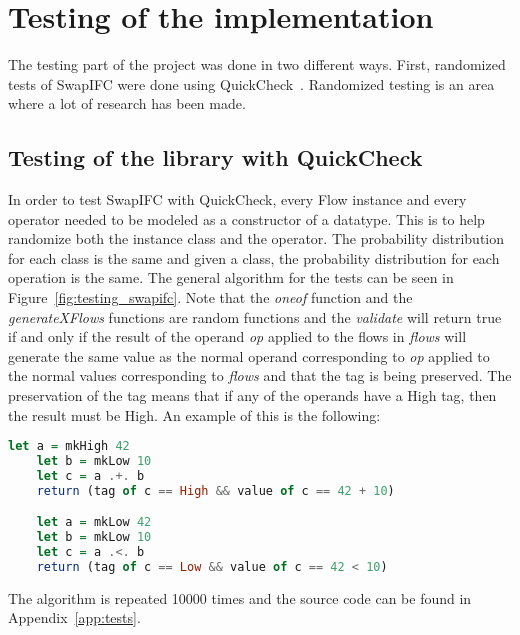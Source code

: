 \chapter{Testing of the implementation}
The testing part of the project was done in two different ways. First, randomized tests of SwapIFC were done using QuickCheck~\cite{quickcheck, quickcheck-wiki}. Randomized testing is an area where a lot of research has been made.
\section{Testing of the library with QuickCheck}
In order to test SwapIFC with QuickCheck, every Flow instance and every operator needed to be modeled as a constructor of a datatype. This is to help randomize both the instance class and the operator. The probability distribution for each class is the same and given a class, the probability distribution for each operation is the same. The general algorithm for the tests can be seen in Figure~\ref{fig:testing_swapifc}. Note that the \emph{oneof} function and the \emph{generateXFlows} functions are random functions and the \emph{validate} will return true if and only if the result of the operand \emph{op} applied to the flows in \emph{flows} will generate the same value as the normal operand corresponding to \emph{op} applied to the normal values corresponding to \emph{flows} and that the tag is being preserved. The preservation of the tag means that if any of the operands have a High tag, then the result must be High. An example of this is the following:
\begin{center}
  \begin{lstlisting}[language=Haskell]
    let a = mkHigh 42
    let b = mkLow 10
    let c = a .+. b
    return (tag of c == High && value of c == 42 + 10)

    let a = mkLow 42
    let b = mkLow 10
    let c = a .<. b
    return (tag of c == Low && value of c == 42 < 10)
  \end{lstlisting}
\end{center}
The algorithm is repeated 10000 times and the source code can be found in Appendix~\ref{app:tests}.

